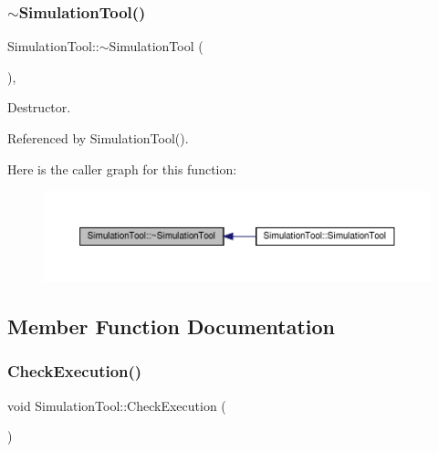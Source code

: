 \subsubsection{\texorpdfstring{$\sim$\+Simulation\+Tool()}{~SimulationTool()}}
{\footnotesize\ttfamily Simulation\+Tool\+::$\sim$\+Simulation\+Tool (\begin{DoxyParamCaption}{ }\end{DoxyParamCaption})\hspace{0.3cm}{\ttfamily [virtual]}, {\ttfamily [default]}}



Destructor. 



Referenced by Simulation\+Tool().

Here is the caller graph for this function\+:
\nopagebreak
\begin{figure}[H]
\begin{center}
\leavevmode
\includegraphics[width=350pt]{d5/dfc/classSimulationTool_a51b21f23f26db8bfcbe9dc18d992a3ea_icgraph}
\end{center}
\end{figure}


\subsection{Member Function Documentation}
\mbox{\label{classSimulationTool_a24b4cde0b09c7496918d20f3896989b6}} 
\subsubsection{\texorpdfstring{Check\+Execution()}{CheckExecution()}}
{\footnotesize\ttfamily void Simulation\+Tool\+::\+Check\+Execution (\begin{DoxyParamCaption}{ }\end{DoxyParamCaption})\hspace{0.3cm}{\ttfamily [virtual]}}



